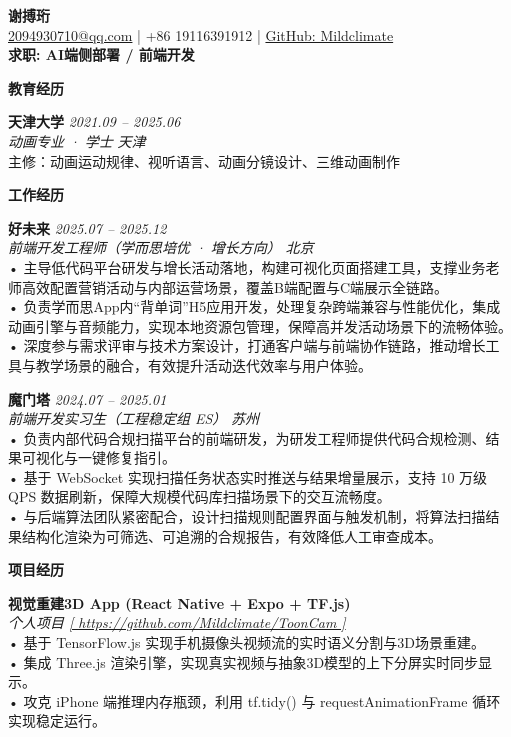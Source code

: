 \documentclass[11pt]{article}
\newcommand{\sectionheader}[1]{%
    \vspace{10pt}%
    \noindent\textcolor{sectionColor}{\textbf{\Large #1}}%
    \vspace{2pt}%
    \hrulefill
    \vspace{6pt}%
}
\newcommand{\entry}[5]{%
    \noindent\textcolor{nameColor}{\textbf{#1}} \hfill \textcolor{dateColor}{\textit{#2}} \\
    \textcolor{dateColor}{\textit{#3}} \hfill \textcolor{dateColor}{\textit{#4}} \\
    \textcolor{bodyColor}{#5}%
    \vspace{6pt}%
}
\begin{document}
\begin{center}
    {\huge \textcolor{nameColor}{\textbf{谢搏珩}}} \\[6pt]
    \colorbox{dateColor!15}{%
        \textcolor{dateColor}{
            \href{mailto:2094930710@qq.com}{2094930710@qq.com} \quad | \quad
            +86 19116391912 \quad | \quad
            \href{https://github.com/mildclimate}{GitHub: Mildclimate}
        }%
    } \\[2pt]
    \textcolor{accentColor}{\textbf{求职: AI端侧部署 / 前端开发}}

\end{center}

\sectionheader{教育经历}

\entry{天津大学}{2021.09 -- 2025.06}
    {动画专业 · 学士}{天津}
    {主修：动画运动规律、视听语言、动画分镜设计、三维动画制作}

\sectionheader{工作经历}

\entry{好未来}{2025.07 -- 2025.12}
{前端开发工程师（学而思培优 · 增长方向）}{北京}
    {• 主导低代码平台研发与增长活动落地，构建可视化页面搭建工具，支撑业务老师高效配置营销活动与内部运营场景，覆盖B端配置与C端展示全链路。 \\
     • 负责学而思App内“背单词”H5应用开发，处理复杂跨端兼容与性能优化，集成动画引擎与音频能力，实现本地资源包管理，保障高并发活动场景下的流畅体验。 \\
     • 深度参与需求评审与技术方案设计，打通客户端与前端协作链路，推动增长工具与教学场景的融合，有效提升活动迭代效率与用户体验。}

\entry{魔门塔}{2024.07 -- 2025.01}
    {前端开发实习生（工程稳定组 ES）}{苏州}
    {• 负责内部代码合规扫描平台的前端研发，为研发工程师提供代码合规检测、结果可视化与一键修复指引。 \\
     • 基于 WebSocket 实现扫描任务状态实时推送与结果增量展示，支持 10 万级 QPS 数据刷新，保障大规模代码库扫描场景下的交互流畅度。 \\
     • 与后端算法团队紧密配合，设计扫描规则配置界面与触发机制，将算法扫描结果结构化渲染为可筛选、可追溯的合规报告，有效降低人工审查成本。}

\sectionheader{项目经历}

\entry{视觉重建3D App (React Native + Expo + TF.js)}{}
    {个人项目 \href{https://github.com/Mildclimate/ToonCam}{[  https://github.com/Mildclimate/ToonCam   ]}}{}
    {• 基于 TensorFlow.js 实现手机摄像头视频流的实时语义分割与3D场景重建。 \\
     • 集成 Three.js 渲染引擎，实现真实视频与抽象3D模型的上下分屏实时同步显示。 \\
     • 攻克 iPhone 端推理内存瓶颈，利用 tf.tidy() 与 requestAnimationFrame 循环实现稳定运行。}
\end{document}
